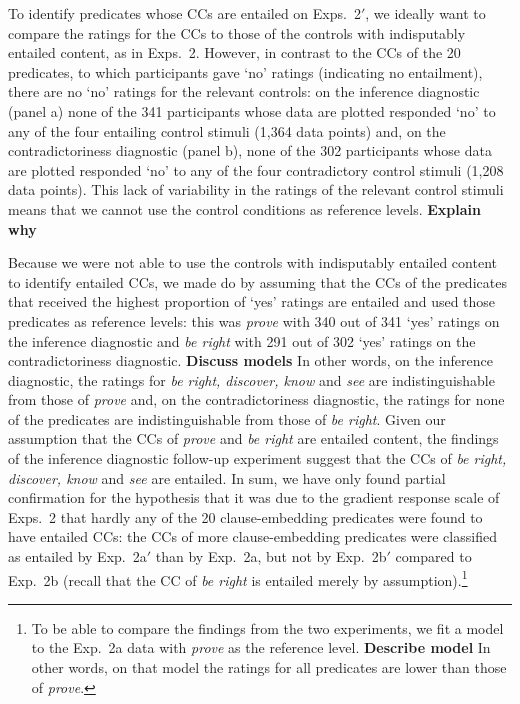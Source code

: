 \documentclass[11pt,fleqn]{article}
\newcommand{\6}{\mbox{$[\hspace*{-.6mm}[$}}
\newcommand{\9}{\mbox{$]\hspace*{-.6mm}]$}}
\begin{document}
{To identify predicates whose CCs are entailed on Exps.~2$'$, we ideally want to compare the ratings for the CCs to those of the controls with indisputably entailed content, as in Exps.~2. However, in contrast to the CCs of the 20 predicates, to which participants gave `no' ratings (indicating no entailment), there are no `no' ratings for the relevant controls: on the inference diagnostic (panel a) none of the 341 participants whose data are plotted responded `no' to any of the four entailing control stimuli (1,364 data points) and, on the contradictoriness diagnostic (panel b), none of the 302 participants whose data are plotted responded `no' to any of the four contradictory control stimuli (1,208 data points). This lack of variability in the ratings of the relevant control stimuli means that we cannot use the control conditions as reference levels. {\bf Explain why}

Because we were not able to use the controls with indisputably entailed content to identify entailed CCs, we made do by assuming that the CCs of the predicates that received the highest proportion of `yes' ratings are entailed and used those predicates as reference levels: this was {\em prove} with 340 out of 341 `yes' ratings on the inference diagnostic and {\em be right} with 291 out of 302 `yes' ratings on the contradictoriness diagnostic. {\bf Discuss models} In other words, on the inference diagnostic, the ratings for {\em be right, discover, know} and {\em see} are indistinguishable from those of {\em prove} and, on the contradictoriness diagnostic, the ratings for none of the predicates are indistinguishable from those of {\em be right}. Given our assumption that the CCs of {\em prove} and {\em be right} are entailed content, the findings of the inference diagnostic follow-up experiment suggest that the CCs of {\em be right, discover, know} and {\em see} are entailed. In sum, we have only found partial confirmation for the hypothesis that it was due to the gradient response scale of Exps.~2 that hardly any of the 20 clause-embedding predicates were found to have entailed CCs: the CCs of more clause-embedding predicates were classified as entailed by Exp.~2a$'$ than by Exp.~2a, but not by Exp.~2b$'$ compared to Exp.~2b (recall that the CC of {\em be right} is entailed merely by assumption).\footnote{To be able to compare the findings from the two experiments, we fit a model to the Exp.~2a data with {\em prove} as the reference level. {\bf Describe model} In other words, on that model the ratings for all predicates are lower than those of {\em prove}.} 

}
\end{document}
